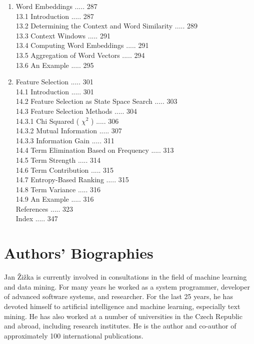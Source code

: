 \documentclass[10pt]{book}
\begin{document}
\begin{enumerate}
12.15 Cluster Labeling ..... 270\\
12.16 A Few Examples ..... 271
  \item Word Embeddings ..... 287\\
13.1 Introduction ..... 287\\
13.2 Determining the Context and Word Similarity ..... 289\\
13.3 Context Windows ..... 291\\
13.4 Computing Word Embeddings ..... 291\\
13.5 Aggregation of Word Vectors ..... 294\\
13.6 An Example ..... 295
  \item Feature Selection ..... 301\\
14.1 Introduction ..... 301\\
14.2 Feature Selection as State Space Search ..... 303\\
14.3 Feature Selection Methods ..... 304\\
14.3.1 Chi Squared ( $\chi^{2}$ ) ..... 306\\
14.3.2 Mutual Information ..... 307\\
14.3.3 Information Gain ..... 311\\
14.4 Term Elimination Based on Frequency ..... 313\\
14.5 Term Strength ..... 314\\
14.6 Term Contribution ..... 315\\
14.7 Entropy-Based Ranking ..... 315\\
14.8 Term Variance ..... 316\\
14.9 An Example ..... 316\\
References ..... 323\\
Index ..... 347
\end{enumerate}

\section*{Authors’ Biographies}
Jan Žižka is currently involved in consultations in the field of machine learning and data mining. For many years he worked as a system programmer, developer of advanced software systems, and researcher. For the last 25 years, he has devoted himself to artificial intelligence and machine learning, especially text mining. He has also worked at a number of universities in the Czech Republic and abroad, including research institutes. He is the author and co-author of approximately 100 international publications.
\end{document}
